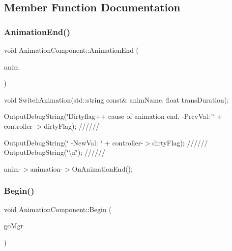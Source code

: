 \subsection{Member Function Documentation}
\mbox{\label{classAnimationComponent_a03636b1eaab7e1a4aaf05d6321ad2478}} 
\subsubsection{\texorpdfstring{Animation\+End()}{AnimationEnd()}}
{\footnotesize\ttfamily void Animation\+Component\+::\+Animation\+End (\begin{DoxyParamCaption}\item[{\hyperlink{structAnimState}{Anim\+State} $\ast$}]{anim }\end{DoxyParamCaption})}



void Switch\+Animation(std\+::string const\& anim\+Name, float trans\+Duration); 

Output\+Debug\+String(\char`\"{}\+Dirtyflag++ cause of animation end. -\/\+Prev\+Val\+: \char`\"{} + controller-\/$>$dirty\+Flag); //////

Output\+Debug\+String(\char`\"{} -\/\+New\+Val\+: \char`\"{} + controller-\/$>$dirty\+Flag); ////// Output\+Debug\+String(\char`\"{}\textbackslash{}n\char`\"{}); //////

anim-\/$>$animation-\/$>$On\+Animation\+End(); \mbox{\label{classAnimationComponent_ab079696aad04351fa60a12040aeffe58}} 
\subsubsection{\texorpdfstring{Begin()}{Begin()}}
{\footnotesize\ttfamily void Animation\+Component\+::\+Begin (\begin{DoxyParamCaption}\item[{\hyperlink{classGameObjectManager}{Game\+Object\+Manager} $\ast$}]{go\+Mgr }\end{DoxyParamCaption})\hspace{0.3cm}{\ttfamily [virtual]}}



